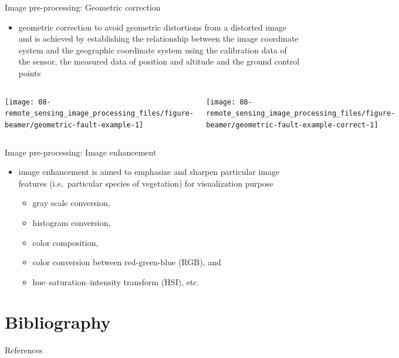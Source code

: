 \documentclass[10pt,dvipsnames,ignorenonframetext,aspectratio=169]{beamer}
\providecommand{\tightlist}{%
  \setlength{\itemsep}{0pt}\setlength{\parskip}{0pt}}
\begin{document}
\begin{frame}{Image pre-processing: Geometric correction}
\protect\hypertarget{image-pre-processing-geometric-correction}{}
\begin{itemize}
\tightlist
\item
  geometric correction to avoid geometric distortions from a distorted
  image and is achieved by establishing the relationship between the
  image coordinate system and the geographic coordinate system using the
  calibration data of the sensor, the measured data of position and
  altitude and the ground control points
\end{itemize}

\begin{columns}[T, onlytextwidth]


\begin{center}\texttt{[image: 08-remote\_sensing\_image\_processing\_files/figure-beamer/geometric-fault-example-1]} \end{center}



\begin{center}\texttt{[image: 08-remote\_sensing\_image\_processing\_files/figure-beamer/geometric-fault-example-correct-1]} \end{center}

\end{columns}
\end{frame}

\begin{frame}{Image pre-processing: Image enhancement}
\protect\hypertarget{image-pre-processing-image-enhancement}{}
\begin{itemize}
\tightlist
\item
  image enhancement is aimed to emphasize and sharpen particular image
  features (i.e.~particular species of vegetation) for visualization
  purpose

  \begin{itemize}
  \tightlist
  \item
    gray scale conversion,
  \item
    histogram conversion,
  \item
    color composition,
  \item
    color conversion between red-green-blue (RGB), and
  \item
    hue--saturation--intensity transform (HSI), etc.
  \end{itemize}
\end{itemize}
\end{frame}

\hypertarget{bibliography}{%
\section{Bibliography}\label{bibliography}}

\begin{frame}{References}
\protect\hypertarget{references}{}
\end{frame}
\end{document}
